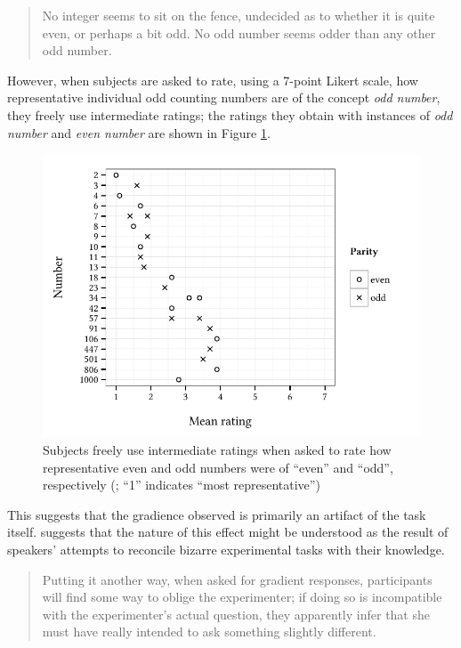 \begin{quote}
No integer seems to sit on the fence, undecided as to whether it is quite even, or perhaps a bit odd. No odd number seems odder than any other odd number. \citep[274]{Armstrong1983}
\end{quote}

\noindent
However, when subjects are asked to rate, using a 7-point Likert scale, how representative individual odd counting numbers are of the concept \emph{odd number}, they freely use intermediate ratings; the ratings they obtain with instances of \emph{odd number} and \emph{even number} are shown in Figure \ref{agg}.

\begin{figure}[t]
\centering
\includegraphics{agg.pdf}
\caption{Subjects freely use intermediate ratings when asked to rate how representative even and odd numbers were of ``even'' and ``odd'', respectively (\citealp{Armstrong1983}; ``1'' indicates ``most representative'')}
\label{agg}
\end{figure}

This suggests that the gradience observed is primarily an artifact of the task itself. 
\citeauthor{Schutze2011} suggests that the nature of this effect might be understood as the result of speakers' attempts to reconcile bizarre experimental tasks with their knowledge.

\begin{quote}
Putting it another way, when asked for gradient responses, participants will find some way to oblige the experimenter; if doing so is incompatible with the experimenter's actual question, they apparently infer that she must have really intended to ask something slightly different. \citep[24]{Schutze2011}
\end{quote}

